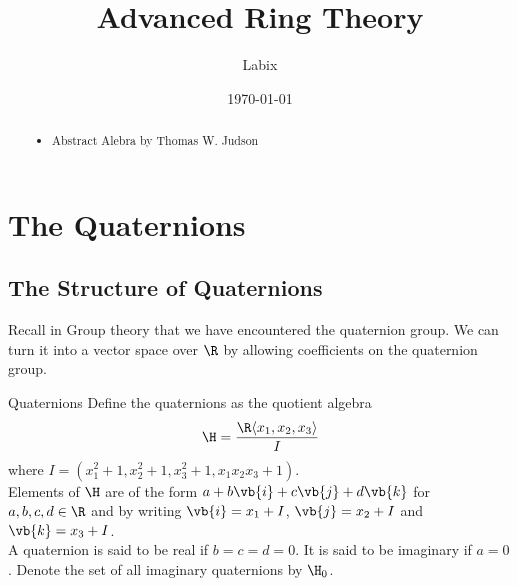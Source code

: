 \documentclass[a4paper]{article}
\title{Advanced Ring Theory}
\author{Labix}
\date{\today}
\begin{document}
\maketitle
\begin{abstract}
\begin{itemize}
\item Abstract Alebra by Thomas W. Judson
\end{itemize}
\end{abstract}
\pagebreak
\tableofcontents

\pagebreak

\section{The Quaternions}
\subsection{The Structure of Quaternions}
Recall in Group theory that we have encountered the quaternion group. We can turn it into a vector space over $\R$ by allowing coefficients on the quaternion group. 

\begin{defn}{Quaternions}{} Define the quaternions as the quotient algebra $$\H=\frac{\R\langle x_1,x_2,x_3\rangle}{I}$$ where $I=(x_1^2+1,x_2^2+1,x_3^2+1,x_1x_2x_3+1)$. \\
Elements of $\H$ are of the form $a+b\vb{i}+c\vb{j}+d\vb{k}$ for $a,b,c,d\in\R$ and by writing $\vb{i}=x_1+I$, $\vb{j}=x_2+I$ and $\vb{k}=x_3+I$. \\
A quaternion is said to be real if $b=c=d=0$. It is said to be imaginary if $a=0$. Denote the set of all imaginary quaternions by $\H_0$. 
\end{defn}
\end{document}
